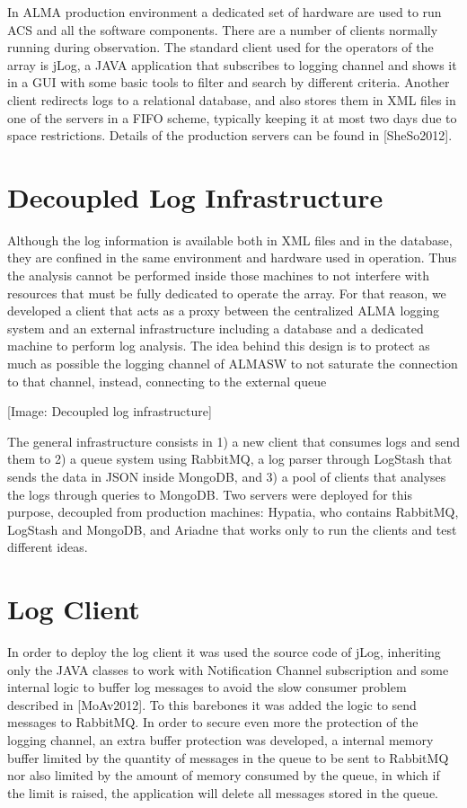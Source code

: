 \documentclass[]{spie}  %
\begin{document}
In ALMA production environment a dedicated set of hardware are used to run ACS
and all the software components. There are a number of clients normally running
during observation. The standard client used for the operators of the array is
jLog, a JAVA application that subscribes to logging channel and shows it in a
GUI with some basic tools to filter and search by different criteria. Another
client redirects logs to a relational database, and also stores them in XML
files in one of the servers in a FIFO scheme, typically keeping it at most two
days due to space restrictions. Details of the production servers can be found
in [SheSo2012].

\section{Decoupled Log Infrastructure}
Although the log information is available both in XML files and in the
database, they are confined in the same environment and hardware used in
operation. Thus the analysis cannot be performed inside those machines to not
interfere with resources that must be fully dedicated to operate the array. For
that reason, we developed a client that acts as a proxy between the centralized
ALMA logging system and an external infrastructure including a database and a
dedicated machine to perform log analysis. The idea behind this design is to
protect as much as possible the logging channel of ALMASW to not saturate the
connection to that channel, instead, connecting to the external queue

[Image: Decoupled log infrastructure]

The general infrastructure consists in 1) a new client that consumes logs and
send them to 2) a queue system using RabbitMQ, a log parser through LogStash
that sends the data in JSON inside MongoDB, and 3) a pool of clients that
analyses the logs through queries to MongoDB. Two servers were deployed for
this purpose, decoupled from production machines: Hypatia, who contains
RabbitMQ, LogStash and MongoDB, and Ariadne that works only to run the clients
and test different ideas.

\section{Log Client}
In order to deploy the log client it was used the source code of jLog,
   inheriting only the JAVA classes to work with Notification Channel
   subscription and some internal logic to buffer log messages to avoid the
   slow consumer problem described in [MoAv2012]. To this barebones it was
   added the logic to send messages to RabbitMQ. In order to secure even more
   the protection of the logging channel, an extra buffer protection was
   developed, a internal memory buffer limited by the quantity of messages in
   the queue to be sent to RabbitMQ nor also limited by the amount of memory
   consumed by the queue, in which if the limit is raised, the application will
   delete all messages stored in the queue.
\end{document}

